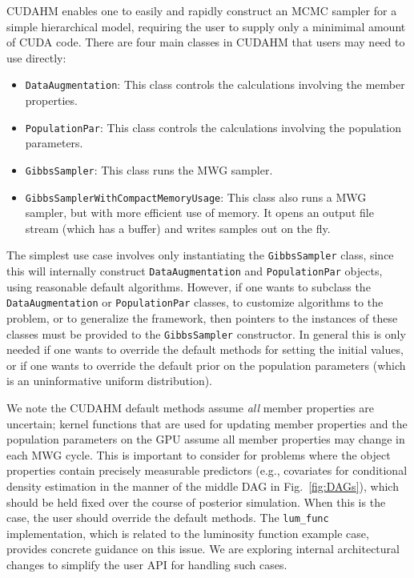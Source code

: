 CUDAHM enables one to easily and rapidly construct an MCMC sampler for a simple hierarchical model, requiring the user to supply only a minimimal amount of CUDA code. 
There are four main classes in CUDAHM that users may need to use directly:
\begin{itemize}
\item \texttt{DataAugmentation}: This class controls the calculations involving the member properties.
\item \texttt{PopulationPar}: This class controls the calculations involving the population parameters.
\item \texttt{GibbsSampler}: This class runs the MWG sampler.
\item \texttt{GibbsSamplerWithCompactMemoryUsage}: This class also runs a MWG sampler, but with more efficient use of memory. It opens an output file stream (which has a buffer) and writes samples out on the fly.
\end{itemize}

The simplest use case involves only instantiating the \texttt{GibbsSampler} class, since this will internally construct \texttt{DataAugmentation} and \texttt{PopulationPar} objects, using reasonable default algorithms.
However, if one wants to subclass the \texttt{DataAugmentation} or \texttt{PopulationPar} classes, to customize algorithms to the problem, or to generalize the framework, then pointers to the instances of these classes must be provided to the \texttt{GibbsSampler} constructor.
In general this is only needed if one wants to override the default methods for setting the initial values, or if one wants to override the default prior on the population parameters (which is an uninformative uniform distribution).

We note the CUDAHM default methods assume \emph{all} member properties are uncertain; kernel functions that are used for updating member properties and the population parameters on the GPU assume all member properties may change in each MWG cycle.
This is important to consider for problems where the object properties contain precisely measurable predictors (e.g., covariates for conditional density estimation in the manner of the middle DAG in Fig.~\ref{fig:DAGs}), which should be held fixed over the course of posterior simulation.
When this is the case, the user should override the default methods.
The \texttt{lum\_func} implementation, which is related to the luminosity function example case, provides concrete guidance on this issue.
We are exploring internal architectural changes to simplify the user API for handling such cases.

